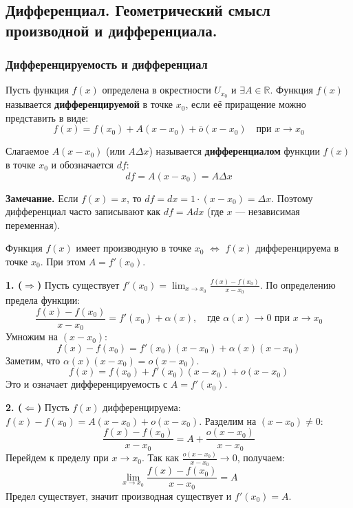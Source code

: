 \subsection{Дифференциал. Геометрический смысл производной и дифференциала.}

\subsubsection*{Дифференцируемость и дифференциал}

\begin{tcolorbox}[title=Определение]
    Пусть функция $f(x)$ определена в окрестности $U_{x_0}$ и $\exists A \in \mathbb{R}$.
    Функция $f(x)$ называется \textbf{дифференцируемой} в точке $x_0$, если её приращение можно представить в виде:
    \[ f(x) = f(x_0) + A(x-x_0) + \bar{o}(x-x_0) \quad \text{при } x \to x_0 \]
    
    Слагаемое $A(x-x_0)$ (или $A\Delta x$) называется \textbf{дифференциалом} функции $f(x)$ в точке $x_0$ и обозначается $df$:
    \[ df = A(x-x_0) = A\Delta x \]
\end{tcolorbox}

\textbf{Замечание.} Если $f(x) = x$, то $df = dx = 1 \cdot (x-x_0) = \Delta x$.
Поэтому дифференциал часто записывают как $df = A dx$ (где $x$ — независимая переменная).

\begin{tcolorbox}[title=Теорема (Связь производной и дифференциала)]
    Функция $f(x)$ имеет производную в точке $x_0$ $\iff$ $f(x)$ дифференцируема в точке $x_0$.
    При этом $A = f'(x_0)$.
\end{tcolorbox}

\begin{tcolorbox}[title=Доказательство]
    \textbf{1. ($\Rightarrow$)}
    Пусть существует $f'(x_0) = \lim_{x\to x_0} \frac{f(x)-f(x_0)}{x-x_0}$.
    По определению предела функции:
    \[ \frac{f(x)-f(x_0)}{x-x_0} = f'(x_0) + \alpha(x), \quad \text{где } \alpha(x) \to 0 \text{ при } x \to x_0 \]
    Умножим на $(x-x_0)$:
    \[ f(x) - f(x_0) = f'(x_0)(x-x_0) + \alpha(x)(x-x_0) \]
    Заметим, что $\alpha(x)(x-x_0) = o(x-x_0)$.
    \[ f(x) = f(x_0) + f'(x_0)(x-x_0) + o(x-x_0) \]
    Это и означает дифференцируемость с $A = f'(x_0)$.

    \textbf{2. ($\Leftarrow$)}
    Пусть $f(x)$ дифференцируема: $f(x) - f(x_0) = A(x-x_0) + o(x-x_0)$.
    Разделим на $(x-x_0) \neq 0$:
    \[ \frac{f(x)-f(x_0)}{x-x_0} = A + \frac{o(x-x_0)}{x-x_0} \]
    Перейдем к пределу при $x \to x_0$. Так как $\frac{o(x-x_0)}{x-x_0} \to 0$, получаем:
    \[ \lim_{x\to x_0} \frac{f(x)-f(x_0)}{x-x_0} = A \]
    Предел существует, значит производная существует и $f'(x_0) = A$.
\end{tcolorbox}

